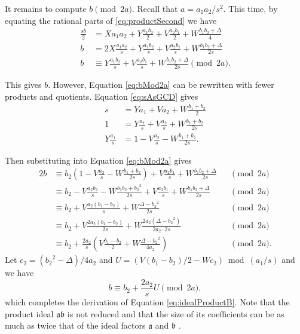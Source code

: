 \documentclass{ucalgthes1}
\theoremstyle{definition}
\begin{document}
It remains to compute $b \pmod{2a}$.  Recall that $a = a_1a_2/s^2$.  This time, by equating the rational parts of \eqref{eq:productSecond} we have
\begin{align}
	\frac{sb}{2} & = Xa_1a_2 + Y\frac{a_1b_2}{2} + V\frac{a_2b_1}{2} + W\frac{b_1b_2 + \Delta}{4} \nonumber \\
	b & = 2X\frac{a_1a_2}{s} + Y\frac{a_1b_2}{s} + V\frac{a_2b_1}{s} + W\frac{b_1b_2 + \Delta}{2s} \nonumber \\
	b & \equiv Y\frac{a_1b_2}{s} + V\frac{a_2b_1}{s} + W\frac{b_1b_2 + \Delta}{2s} \pmod{2a}. \label{eq:bMod2a}
\end{align}

\noindent
This gives $b$.  However, Equation \eqref{eq:bMod2a} can be rewritten with fewer products and quotients.  Equation \eqref{eq:sAsGCD} gives
\begin{align*}
	s & = Ya_1 + Va_2 + W\frac{b_1+b_2}{2} \\
	1 & = Y\frac{a_1}{s} + V\frac{a_2}{s} + W\frac{b_1+b_2}{2s} \\
	Y\frac{a_1}{s} & = 1 - V\frac{a_2}{s} - W\frac{b_1+b_2}{2s}.
\end{align*}

\noindent
Then substituting into Equation \eqref{eq:bMod2a} gives
\begin{alignat*}{2}
	b & \equiv b_2(1-V\frac{a_2}{s} - W\frac{b_1+b_2}{2s}) + V\frac{a_2b_1}{s} + W\frac{b_1b_2 + \Delta}{2s} && \pmod{2a} \\
	& \equiv b_2 - V\frac{a_2b_2}{s} - W\frac{b_1b_2+{b_2}^2}{2s} + V\frac{a_2b_1}{s} + W\frac{b_1b_2 + \Delta}{2s} && \pmod{2a} \\
	& \equiv b_2 + V\frac{a_2(b_1-b_2)}{s} + W\frac{\Delta - {b_2}^2}{2s} && \pmod{2a} \\
	& \equiv b_2 + V\frac{2a_2(b_1-b_2)}{2s} + W\frac{2a_2(\Delta - {b_2}^2)}{2a_2 \cdot 2s} && \pmod{2a} \\
	& \equiv b_2 + \frac{2a_2}{s} \left( V\frac{b_1-b_2}{2} + W\frac{\Delta - {b_2}^2}{4a_2} \right) && \pmod{2a}.
\end{alignat*}
Let $c_2 = ({b_2}^2 - \Delta)/4a_2$ and $U = (V(b_1-b_2)/2 - Wc_2) \bmod{(a_1/s)}$ and we have
\[
	b \equiv b_2 + \frac{2a_2}{s} U \pmod{2a},
\]
which completes the derivation of Equation \ref{eq:idealProductB}.  Note that the product ideal $\mathfrak a \mathfrak b$ is not reduced and that the size of its coefficients can be as much as twice that of the ideal factors $\mathfrak a$ and $\mathfrak b$ \cite[p.118]{Jacobson2009}.
\end{document}

